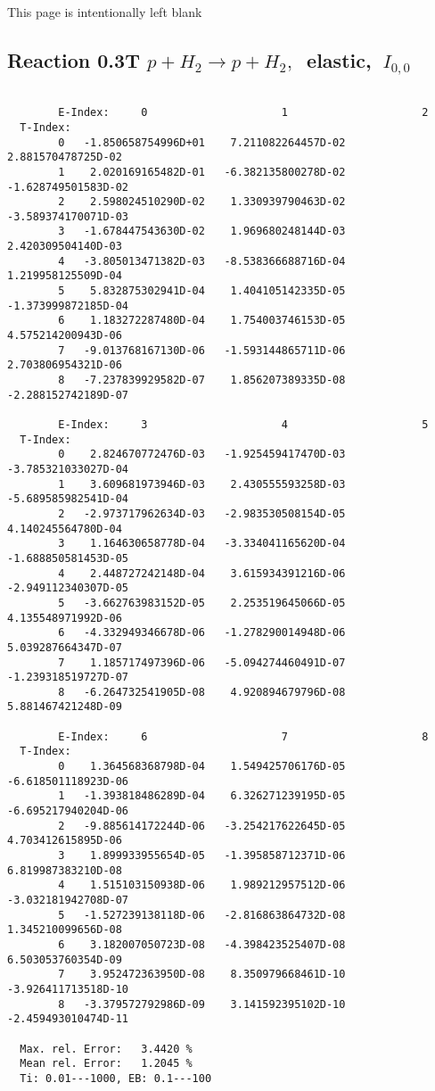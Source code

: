 \documentclass[12pt]{article}
\begin{document}
\newpage
This page is intentionally left blank
\newpage


\subsection{
Reaction 0.3T  $p + H_2 \rightarrow  p + H_2 ,\ $  elastic,
$\  I_{0,0}$
}

\begin{small}\begin{verbatim}

        E-Index:     0                     1                     2
  T-Index:
        0   -1.850658754996D+01    7.211082264457D-02    2.881570478725D-02
        1    2.020169165482D-01   -6.382135800278D-02   -1.628749501583D-02
        2    2.598024510290D-02    1.330939790463D-02   -3.589374170071D-03
        3   -1.678447543630D-02    1.969680248144D-03    2.420309504140D-03
        4   -3.805013471382D-03   -8.538366688716D-04    1.219958125509D-04
        5    5.832875302941D-04    1.404105142335D-05   -1.373999872185D-04
        6    1.183272287480D-04    1.754003746153D-05    4.575214200943D-06
        7   -9.013768167130D-06   -1.593144865711D-06    2.703806954321D-06
        8   -7.237839929582D-07    1.856207389335D-08   -2.288152742189D-07

        E-Index:     3                     4                     5
  T-Index:
        0    2.824670772476D-03   -1.925459417470D-03   -3.785321033027D-04
        1    3.609681973946D-03    2.430555593258D-03   -5.689585982541D-04
        2   -2.973717962634D-03   -2.983530508154D-05    4.140245564780D-04
        3    1.164630658778D-04   -3.334041165620D-04   -1.688850581453D-05
        4    2.448727242148D-04    3.615934391216D-06   -2.949112340307D-05
        5   -3.662763983152D-05    2.253519645066D-05    4.135548971992D-06
        6   -4.332949346678D-06   -1.278290014948D-06    5.039287664347D-07
        7    1.185717497396D-06   -5.094274460491D-07   -1.239318519727D-07
        8   -6.264732541905D-08    4.920894679796D-08    5.881467421248D-09

        E-Index:     6                     7                     8
  T-Index:
        0    1.364568368798D-04    1.549425706176D-05   -6.618501118923D-06
        1   -1.393818486289D-04    6.326271239195D-05   -6.695217940204D-06
        2   -9.885614172244D-06   -3.254217622645D-05    4.703412615895D-06
        3    1.899933955654D-05   -1.395858712371D-06    6.819987383210D-08
        4    1.515103150938D-06    1.989212957512D-06   -3.032181942708D-07
        5   -1.527239138118D-06   -2.816863864732D-08    1.345210099656D-08
        6    3.182007050723D-08   -4.398423525407D-08    6.503053760354D-09
        7    3.952472363950D-08    8.350979668461D-10   -3.926411713518D-10
        8   -3.379572792986D-09    3.141592395102D-10   -2.459493010474D-11

  Max. rel. Error:   3.4420 %
  Mean rel. Error:   1.2045 %
  Ti: 0.01---1000, EB: 0.1---100
\end{verbatim}\end{small}
\end{document}

